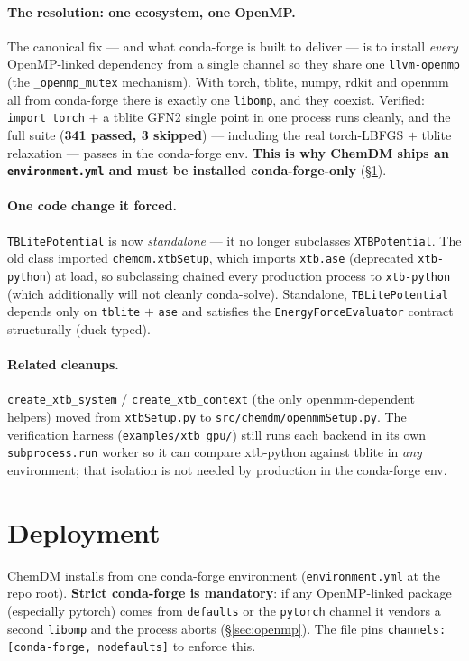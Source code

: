 \documentclass[11pt]{article}
\newcommand{\code}[1]{\texttt{#1}}
\begin{document}
\paragraph{The resolution: one ecosystem, one OpenMP.} The canonical fix --- and
what conda-forge is built to deliver --- is to install \emph{every} OpenMP-linked
dependency from a single channel so they share one \code{llvm-openmp} (the
\code{\_openmp\_mutex} mechanism). With torch, tblite, numpy, rdkit and openmm all
from conda-forge there is exactly one \code{libomp}, and they coexist. Verified:
\code{import torch} $+$ a tblite GFN2 single point in one process runs cleanly, and
the full suite (\textbf{341 passed, 3 skipped}) --- including the real torch-LBFGS
$+$ tblite relaxation --- passes in the conda-forge env. \textbf{This is why ChemDM
ships an \code{environment.yml} and must be installed conda-forge-only}
(\S\ref{sec:deploy}).

\paragraph{One code change it forced.} \code{TBLitePotential} is now
\emph{standalone} --- it no longer subclasses \code{XTBPotential}. The old class
imported \code{chemdm.xtbSetup}, which imports \code{xtb.ase} (deprecated
\code{xtb-python}) at load, so subclassing chained every production process to
\code{xtb-python} (which additionally will not cleanly conda-solve). Standalone,
\code{TBLitePotential} depends only on \code{tblite} $+$ \code{ase} and satisfies
the \code{EnergyForceEvaluator} contract structurally (duck-typed).

\paragraph{Related cleanups.} \code{create\_xtb\_system} /
\code{create\_xtb\_context} (the only openmm-dependent helpers) moved from
\code{xtbSetup.py} to \code{src/chemdm/openmmSetup.py}. The verification harness
(\code{examples/xtb\_gpu/}) still runs each backend in its own
\code{subprocess.run} worker so it can compare xtb-python against tblite in \emph{any}
environment; that isolation is not needed by production in the conda-forge env.

\section{Deployment}
\label{sec:deploy}

ChemDM installs from one conda-forge environment (\code{environment.yml} at the
repo root). \textbf{Strict conda-forge is mandatory}: if any OpenMP-linked package
(especially pytorch) comes from \code{defaults} or the \code{pytorch} channel it
vendors a second \code{libomp} and the process aborts (\S\ref{sec:openmp}). The
file pins \code{channels: [conda-forge, nodefaults]} to enforce this.
\end{document}
